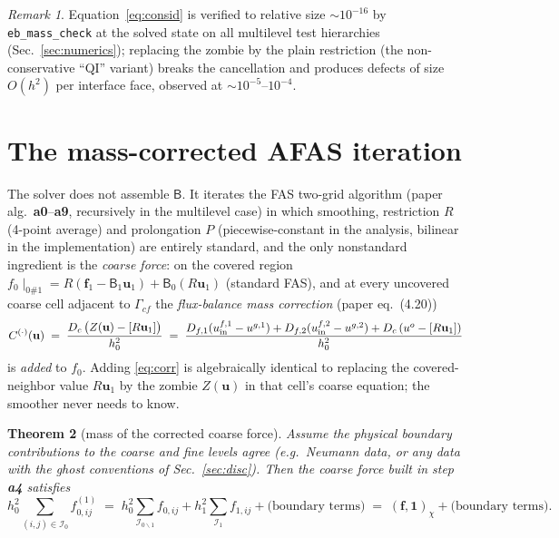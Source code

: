 \documentclass[11pt]{article}
\newtheorem{theorem}{Theorem}[section]
\theoremstyle{remark}
\newtheorem{remark}[theorem]{Remark}
\newcommand{\ip}[2]{\left(#1,#2\right)_\chi}
\begin{document}
\begin{remark}
Equation~\eqref{eq:consid} is verified to relative size
$\sim\!10^{-16}$ by \texttt{eb\_mass\_check} at the solved state on all
multilevel test hierarchies (Sec.~\ref{sec:numerics}); replacing the
zombie by the plain restriction (the non-conservative ``QI'' variant)
breaks the cancellation and produces defects of size $O(h^2)$ per
interface face, observed at $\sim\!10^{-5}$--$10^{-4}$.
\end{remark}

\section{The mass-corrected AFAS iteration}

The solver does not assemble $\mathsf B$.  It iterates the FAS two-grid
algorithm (paper alg.\ \textbf{a0}--\textbf{a9}, recursively in the
multilevel case) in which smoothing, restriction $R$ (4-point average)
and prolongation $P$ (piecewise-constant in the analysis, bilinear in
the implementation) are entirely standard, and the only nonstandard
ingredient is the \emph{coarse force}: on the covered region
$f_0\!\mid_{0\#1} = R(\mathbf f_1-\mathsf B_1\mathbf u_1) +
\mathsf B_0(R\mathbf u_1)$ (standard FAS), and at every uncovered coarse
cell adjacent to $\Gamma_{cf}$ the \emph{flux-balance mass correction}
(paper eq.~(4.20))
\begin{equation}\label{eq:corr}
  C^{(\cdot)}(\mathbf u) \;=\;
  \frac{D_c\,\bigl(Z(\mathbf u)-[R\mathbf u_1]\bigr)}{h_0^2}
  \;=\;
  \frac{D_{f,1}(u^{f,1}_{\rm in}-u^{g,1})
      + D_{f,2}(u^{f,2}_{\rm in}-u^{g,2})
      + D_c\,(u^{o}-[R\mathbf u_1])}{h_0^2}
\end{equation}
is \emph{added} to $f_0$.  Adding \eqref{eq:corr} is algebraically
identical to replacing the covered-neighbor value $R\mathbf u_1$ by the
zombie $Z(\mathbf u)$ in that cell's coarse equation; the smoother never
needs to know.

\begin{theorem}[mass of the corrected coarse force]\label{thm:coarsemass}
Assume the physical boundary contributions to the coarse and fine levels
agree (e.g.\ Neumann data, or any data with the ghost conventions of
Sec.~\ref{sec:disc}).  Then the coarse force built in step \textbf{a4}
satisfies
\[
  h_0^2\!\!\sum_{(i,j)\in\mathcal I_0} f^{(1)}_{0,ij}
  \;=\; h_0^2\!\!\sum_{\mathcal I_{0\backslash1}} f_{0,ij}
      + h_1^2\!\!\sum_{\mathcal I_1} f_{1,ij}
      + \text{(boundary terms)}
  \;=\;\ip{\mathbf f}{\mathbf 1} + \text{(boundary terms)} .
\]
\end{theorem}
\end{document}
